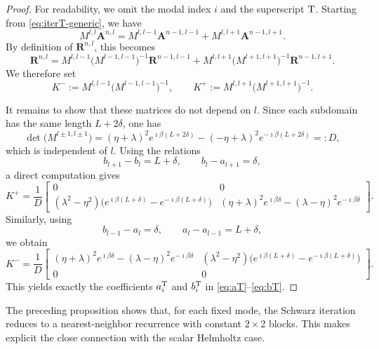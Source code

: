 \documentclass[smallextended]{svjour3}       %
\begin{document}
\begin{proof}
For readability, we omit the modal index \(i\) and the superscript \({\rm T}\). Starting from \eqref{eq:iterT-generic}, we have
\[
M^{l,l}\mathbf A^{n,l}
=
M^{l,l-1}\mathbf A^{n-1,l-1}
+
M^{l,l+1}\mathbf A^{n-1,l+1}.
\]
By definition of \(\mathbf R^{n,l}\), this becomes
\[
\mathbf R^{n,l}
=
M^{l,l-1}\bigl(M^{l-1,l-1}\bigr)^{-1}\mathbf R^{n-1,l-1}
+
M^{l,l+1}\bigl(M^{l+1,l+1}\bigr)^{-1}\mathbf R^{n-1,l+1}.
\]
We therefore set
\[
K^-:=M^{l,l-1}\bigl(M^{l-1,l-1}\bigr)^{-1},
\qquad
K^+:=M^{l,l+1}\bigl(M^{l+1,l+1}\bigr)^{-1}.
\]

It remains to show that these matrices do not depend on \(l\). Since each subdomain has the same length \(L+2\delta\), one has
\[
\det\bigl(M^{l\pm1,l\pm1}\bigr)
=
\left(\eta+\lambda\right)^2e^{\imath\beta(L+2\delta)}
-
\left(-\eta+\lambda\right)^2e^{-\imath\beta(L+2\delta)}
=:D,
\]
which is independent of \(l\). Using the relations
\[
b_{l+1}-b_l=L+\delta,
\qquad
b_l-a_{l+1}=\delta,
\]
a direct computation gives
\[
K^+
=
\frac{1}{D}
\begin{bmatrix}
0 & 0\\
(\lambda^2-\eta^2)\bigl(e^{\imath\beta(L+\delta)}-e^{-\imath\beta(L+\delta)}\bigr)
&
(\eta+\lambda)^2e^{\imath\beta\delta}-(\lambda-\eta)^2e^{-\imath\beta\delta}
\end{bmatrix}.
\]
Similarly, using
\[
b_{l-1}-a_l=\delta,
\qquad
a_l-a_{l-1}=L+\delta,
\]
we obtain
\[
K^-
=
\frac{1}{D}
\begin{bmatrix}
(\eta+\lambda)^2e^{\imath\beta\delta}-(\lambda-\eta)^2e^{-\imath\beta\delta}
&
(\lambda^2-\eta^2)\bigl(e^{\imath\beta(L+\delta)}-e^{-\imath\beta(L+\delta)}\bigr)
\\
0 & 0
\end{bmatrix}.
\]
This yields exactly the coefficients \(a_i^{\rm T}\) and \(b_i^{\rm T}\) in \eqref{eq:aT}--\eqref{eq:bT}.
\end{proof}



The preceding proposition shows that, for each fixed mode, the Schwarz iteration reduces to a nearest-neighbor recurrence with constant \(2\times2\) blocks. This makes explicit the close connection with the scalar Helmholtz case.
\end{document}
